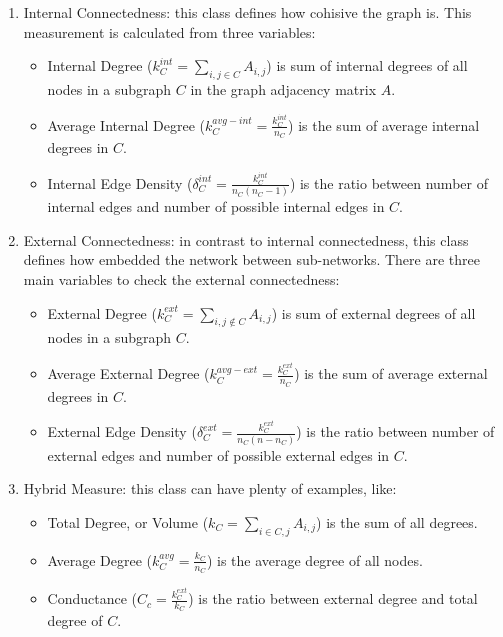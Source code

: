 	\begin{enumerate}
		\item Internal Connectedness: this class defines how cohisive the graph is. This measurement is calculated from three variables:
		
		\begin{itemize}
			\item Internal Degree ($k^{int}_{C}=\sum_{i,j\in C}A_{i,j}$) is sum of internal degrees of all nodes in a subgraph $C$ in the graph adjacency matrix $A$.
			
			\item Average Internal Degree ($k^{avg-int}_{C}=\frac{k^{int}_{C}}{n_C}$) is the sum of average internal degrees in $C$.
			
			\item Internal Edge Density ($\delta^{int}_{C}=\frac{k^{int}_{C}}{n_C(n_C-1)}$) is the ratio between number of internal edges and number of possible internal edges in $C$.
		\end{itemize}
		
		\item External Connectedness: in contrast to internal connectedness, this class defines how embedded the network between sub-networks. There are three main variables to check the external connectedness:
		
		\begin{itemize}
			\item External Degree ($k^{ext}_{C}=\sum_{i,j\not\in C}A_{i,j}$) is sum of external degrees of all nodes in a subgraph $C$.
			
			\item Average External Degree ($k^{avg-ext}_{C}=\frac{k^{ext}_{C}}{n_C}$) is the sum of average external degrees in $C$.
			
			\item External Edge Density ($\delta^{ext}_{C}=\frac{k^{ext}_{C}}{n_C(n-n_C)}$) is the ratio between number of external edges and number of possible external edges in $C$.
		\end{itemize}
		
		\item Hybrid Measure: this class can have plenty of examples, like:
		
		\begin{itemize}
			\item Total Degree, or Volume ($k_C=\sum_{i\in C,j}A_{i,j}$) is the sum of all degrees.
			
			\item Average Degree ($k^{avg}_{C}=\frac{k_C}{n_C}$) is the average degree of all nodes.
			
			\item Conductance ($C_c=\frac{k^{ext}_C}{k_C}$) is the ratio between external degree and total degree of $C$.
		\end{itemize}
		
	\end{enumerate}
	
